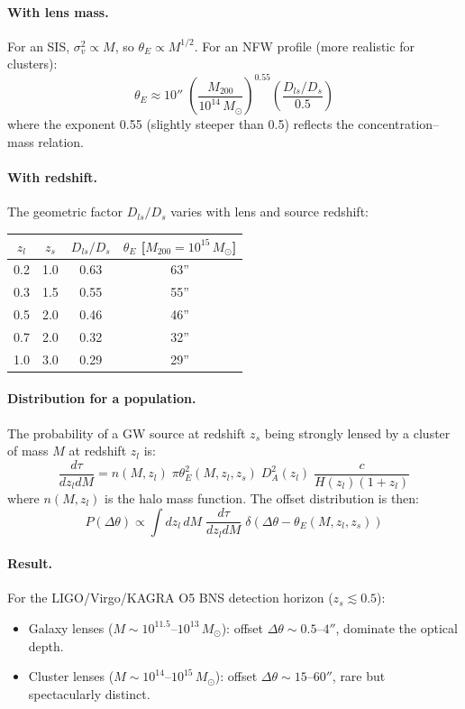\documentclass[11pt,a4paper]{article}
\begin{document}
\paragraph{With lens mass.}
For an SIS, $\sigma_v^2 \propto M$, so $\theta_E \propto M^{1/2}$.
For an NFW profile (more realistic for clusters):
\begin{equation}
\theta_E \approx 10''\;\left(\frac{M_{200}}{10^{14}\,M_\odot}\right)^{0.55}
\left(\frac{D_{ls}/D_s}{0.5}\right)
\end{equation}
where the exponent 0.55 (slightly steeper than 0.5) reflects the
concentration--mass relation.

\paragraph{With redshift.}
The geometric factor $D_{ls}/D_s$ varies with lens and source redshift:
\begin{center}
\begin{tabular}{cccc}
\toprule
$z_l$ & $z_s$ & $D_{ls}/D_s$ & $\theta_E$ [$M_{200} = 10^{15}\,M_\odot$] \\
\midrule
0.2 & 1.0 & 0.63 & 63'' \\
0.3 & 1.5 & 0.55 & 55'' \\
0.5 & 2.0 & 0.46 & 46'' \\
0.7 & 2.0 & 0.32 & 32'' \\
1.0 & 3.0 & 0.29 & 29'' \\
\bottomrule
\end{tabular}
\end{center}

\paragraph{Distribution for a population.}
The probability of a GW source at redshift $z_s$ being strongly
lensed by a cluster of mass $M$ at redshift $z_l$ is:
\begin{equation}
\frac{d\tau}{dz_l dM} = n(M,z_l)\;\pi\theta_E^2(M,z_l,z_s)\;
D_A^2(z_l)\;\frac{c}{H(z_l)(1+z_l)}
\end{equation}
where $n(M,z_l)$ is the halo mass function.  The offset distribution
is then:
\begin{equation}
P(\Delta\theta) \propto \int dz_l\,dM\;\frac{d\tau}{dz_l dM}\;
\delta(\Delta\theta - \theta_E(M,z_l,z_s))
\end{equation}

\paragraph{Result.}
For the LIGO/Virgo/KAGRA O5 BNS detection horizon ($z_s \lesssim 0.5$):
\begin{itemize}
\item Galaxy lenses ($M \sim 10^{11.5}$--$10^{13}\,M_\odot$): offset
  $\Delta\theta \sim 0.5$--$4''$, dominate the optical depth.
\item Cluster lenses ($M \sim 10^{14}$--$10^{15}\,M_\odot$): offset
  $\Delta\theta \sim 15$--$60''$, rare but spectacularly distinct.
\end{itemize}
\end{document}
